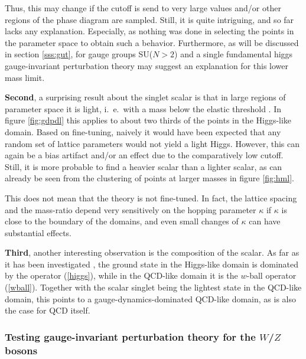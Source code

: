 \documentclass[final,12pt]{article}
\newcommand*{\pref}[1]{(\ref{#1})}
\newcommand*{\1}{1\!\!\!\bot}
\begin{document}
Thus, this may change if the cutoff is send to very large values and/or other regions of the phase diagram are sampled. Still, it is quite intriguing, and so far lacks any explanation. Especially, as nothing was done in selecting the points in the parameter space to obtain such a behavior. Furthermore, as will be discussed in section \ref{sss:gut}, for gauge groups SU($N>2$) and a single fundamental higgs gauge-invariant perturbation theory may suggest an explanation for this lower mass limit.

{\bf Second}, a surprising result about the singlet scalar is that in large regions of parameter space it is light, i.\ e.\ with a mass below the elastic threshold \cite{Wurtz:2013ova,Maas:2013aia,Maas:2014pba,Maas:2012tj,Evertz:1986vp,Evertz:1985fc,Langguth:1985eu,Langguth:1985dr}. In figure \ref{fig:gdpdl} this applies to about two thirds of the points in the Higgs-like domain. Based on fine-tuning, naively it would have been expected that any random set of lattice parameters would not yield a light Higgs. However, this can again be a bias artifact and/or an effect due to the comparatively low cutoff. Still, it is more probable to find a heavier scalar than a lighter scalar, as can already be seen from the clustering of points at larger masses in figure \ref{fig:hml}.

This does not mean that the theory is not fine-tuned. In fact, the lattice spacing and the mass-ratio depend very sensitively on the hopping parameter $\kappa$ if $\kappa$ is close to the boundary of the domains, and even small changes of $\kappa$ can have substantial effects.

{\bf Third}, another interesting observation is the composition of the scalar. As far as it has been investigated \cite{Maas:2014pba,Wurtz:2013ova}, the ground state in the Higgs-like domain is dominated by the operator \pref{higgs}, while in the QCD-like domain it is the $w$-ball operator \pref{wball}. Together with the scalar singlet being the lightest state in the QCD-like domain, this points to a gauge-dynamics-dominated QCD-like domain, as is also the case for QCD itself.

\subsubsection{Testing gauge-invariant perturbation theory for the $W$/$Z$ bosons}\label{sss:w}
\end{document}
